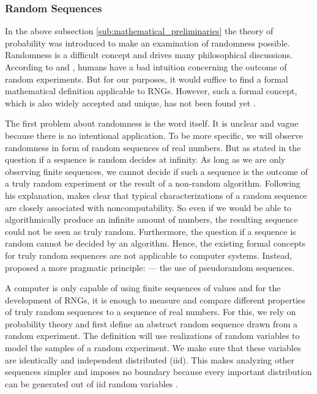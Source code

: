 \documentclass{stdlocal}
\begin{document}
    \subsubsection*{Random Sequences}
    In the above subsection \ref{sub:mathematical_preliminaries} the theory of probability was introduced to make an examination of randomness possible.
    Randomness is a difficult concept and drives many philosophical discussions.
    According to \textcite{volchan2002} and \textcite[\ppno~10-11]{kneusel2018}, humans have a bad intuition concerning the outcome of random experiments.
    But for our purposes, it would suffice to find a formal mathematical definition applicable to RNGs.
    However, such a formal concept, which is also widely accepted and unique, has not been found yet \autocite{volchan2002}.

    The first problem about randomness is the word itself.
    It is unclear and vague because there is no intentional application.
    To be more specific, we will observe randomness in form of random sequences of real numbers.
    But as stated in \textcite{volchan2002} the question if a sequence is random decides at infinity.
    As long as we are only observing finite sequences, we cannot decide if such a sequence is the outcome of a truly random experiment or the result of a non-random algorithm.
    Following his explanation, \citeauthor{volchan2002} makes clear that typical characterizations of a random sequence are closely associated with noncomputability.
    So even if we would be able to algorithmically produce an infinite amount of numbers, the resulting sequence could not be seen as truly random.
    Furthermore, the question if a sequence is random cannot be decided by an algorithm.
    Hence, the existing formal concepts for truly random sequences are not applicable to computer systems.
    Instead, \citeauthor{volchan2002} proposed a more pragmatic principle:  --- the use of pseudorandom sequences.

    A computer is only capable of using finite sequences of values and for the development of RNGs, it is enough to measure and compare different properties of truly random sequences to a sequence of real numbers.
    For this, we rely on probability theory and first define an abstract random sequence drawn from a random experiment.
    The definition will use realizations of random variables to model the samples of a random experiment.
    We make sure that these variables are identically and independent distributed (iid).
    This makes analyzing other sequences simpler and imposes no boundary because every important distribution can be generated out of iid random variables \autocite[\ppno~81-111]{kneusel2018}.
\end{document}
